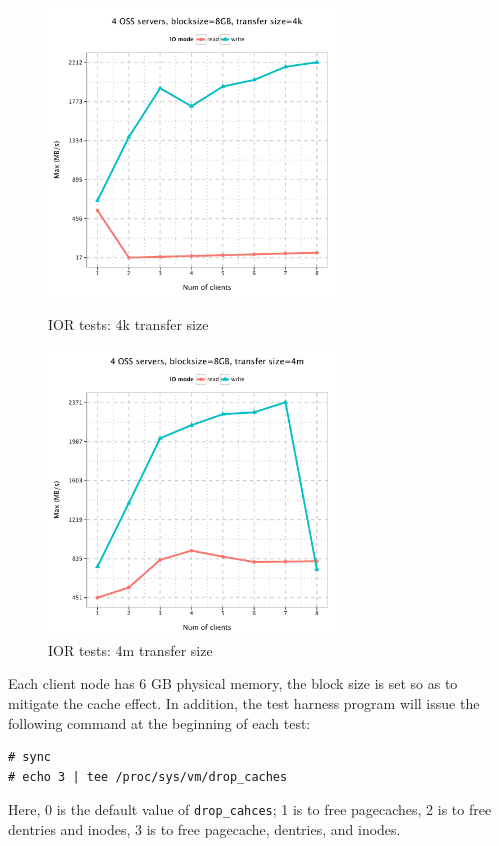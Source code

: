 \documentclass{article}
\begin{document}
\begin{figure}[h]
\centering
\begin{minipage}[t]{0.5\linewidth}
\centering
\includegraphics[width=3in]{data/ior_4k}
\caption{IOR tests: 4k transfer size}
\label{fig:ior4k}
\end{minipage}%
\begin{minipage}[t]{0.5\linewidth}
\centering
\includegraphics[width=3in]{data/ior_4m}
\caption{IOR tests: 4m transfer size}
\label{fig:ior4m}
\end{minipage}%
\end{figure}

Each client node has 6 GB physical memory, the block size is set so as to
mitigate the cache effect. In addition, the test harness program will issue the
following command at the beginning of each test: 
\begin{Verbatim}
# sync
# echo 3 | tee /proc/sys/vm/drop_caches
\end{Verbatim}



Here, 0 is the default value of \verb!drop_cahces!; 1 is to free pagecaches, 2
is to free dentries and inodes, 3 is to free pagecache, dentries, and inodes.
\end{document}
